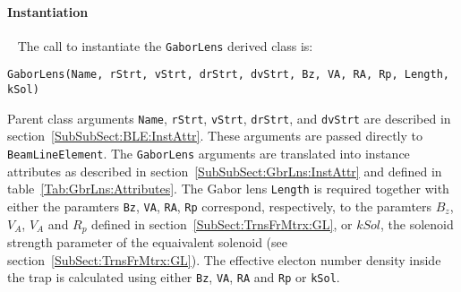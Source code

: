 \paragraph{Instantiation} ~\newline
\noindent
The call to instantiate the \texttt{GaborLens} derived class is:
\begin{center}
  \texttt{GaborLens(Name, rStrt, vStrt, drStrt, dvStrt,
          Bz, VA, RA, Rp, Length, kSol)}
\end{center}
Parent class arguments \texttt{Name}, \texttt{rStrt}, \texttt{vStrt},
\texttt{drStrt}, and \texttt{dvStrt} are described in
section~\ref{SubSubSect:BLE:InstAttr}.
These arguments are passed directly to \texttt{BeamLineElement}.
The \texttt{GaborLens} arguments are translated into instance
attributes as described in section~\ref{SubSubSect:GbrLns:InstAttr} and
defined in table~\ref{Tab:GbrLns:Attributes}. 
The Gabor lens \texttt{Length} is required together with either the
paramters \texttt{Bz}, \texttt{VA}, \texttt{RA}, \texttt{Rp}
correspond, respectively, to the paramters $B_z$, $V_A$, $V_A$ and
$R_p$ defined in section~\ref{SubSect:TrnsFrMtrx:GL}, or $kSol$, the
solenoid strength parameter of the equaivalent solenoid (see
section~\ref{SubSect:TrnsFrMtrx:GL}).
The effective electon number density inside the trap is calculated
using either \texttt{Bz}, \texttt{VA}, \texttt{RA} and \texttt{Rp}
or \texttt{kSol}.

